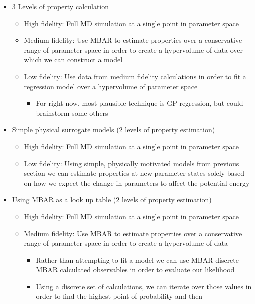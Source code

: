 \documentclass[aps,pre,nofootinbib,superscriptaddress,linenumbers,10pt, draft,tightenlines]{revtex4-1}
\begin{document}
\begin{itemize}
\begin{itemize}
\begin{itemize}
        	\item 3 Levels of property calculation
        	\begin{itemize}
        		\item High fidelity: Full MD simulation at a single point in parameter space
        		\item Medium fidelity: Use MBAR to estimate properties over a conservative range of parameter space in order to create a hypervolume of data
        		      over which we can construct a model
        		\item Low fidelity: Use data from medium fidelity calculations in order to fit a regression model over a hypervolume of parameter space
        		\begin{itemize}
        			\item For right now, most plausible technique is GP regression, but could brainstorm some others
        		\end{itemize}
        	\end{itemize}
            \item Simple physical surrogate models (2 levels of property estimation)
            \begin{itemize}
            	\item High fidelity: Full MD simulation at a single point in parameter space
            	\item Low fidelity: Using simple, physically motivated models from previous section we can estimate properties at new parameter states
            	      solely based on how we expect the change in parameters to affect the potential energy
            \end{itemize}
            \item Using MBAR as a look up table (2 levels of property estimation)
            \begin{itemize}
            	\item High fidelity: Full MD simulation at a single point in parameter space
            	\item Medium fidelity: Use MBAR to estimate properties over a conservative range of parameter space in order to create a hypervolume of data
            	\begin{itemize}
            		\item Rather than attempting to fit a model we can use MBAR discrete MBAR calculated observables in order to evaluate our likelihood
            		\item Using a discrete set of calculations, we can iterate over those values in order to find the highest point of probability and then 

\end{itemize}
\end{itemize}
\end{itemize}
\end{itemize}
\end{itemize}
\end{document}
